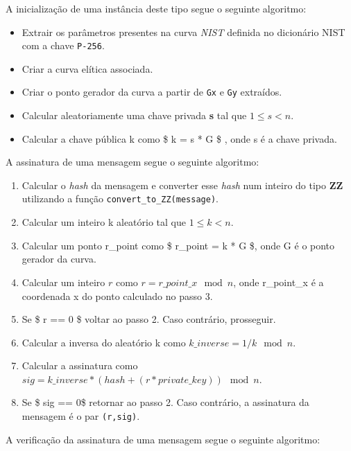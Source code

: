 \documentclass[11pt]{article}
\providecommand{\tightlist}{%
      \setlength{\itemsep}{0pt}\setlength{\parskip}{0pt}}
\begin{document}
A inicialização de uma instância deste tipo segue o seguinte algoritmo:

\begin{itemize}
\tightlist
\item
  Extrair os parâmetros presentes na curva \emph{NIST} definida no
  dicionário NIST com a chave \texttt{P-256}.
\item
  Criar a curva elítica associada.
\item
  Criar o ponto gerador da curva a partir de \texttt{Gx} e \texttt{Gy}
  extraídos.
\item
  Calcular aleatoriamente uma chave privada \textbf{s} tal que $1
  \leqslant s < n$.
  
\item
  Calcular a chave pública k como \$ k = s * G \$ , onde s é a chave
  privada.
\end{itemize}

A assinatura de uma mensagem segue o seguinte algoritmo:

\begin{enumerate}
\def\labelenumi{\arabic{enumi}.}
\tightlist
\item
  Calcular o \emph{hash} da mensagem e converter esse \emph{hash} num
  inteiro do tipo \textbf{ZZ} utilizando a função
  \texttt{convert\_to\_ZZ(message)}.
\item
  Calcular um inteiro k aleatório tal que $1 \leqslant k < n$.
\item
  Calcular um ponto r\_point como \$ r\_point = k * G \$, onde G é o
  ponto gerador da curva.
\item
  Calcular um inteiro $r$ como $r = r\_point\_x \mod n $, onde
  r\_point\_x é a coordenada x do ponto calculado no passo 3.
\item
  Se \$ r == 0 \$ voltar ao passo 2. Caso contrário, prosseguir.
\item
  Calcular a inversa do aleatório k como $ k\_inverse = 1/k \mod n $.
\item
  Calcular a assinatura como $ sig = k\_inverse * (hash + (r *
  private\_key)) \mod n $.
\item
  Se \$ sig == 0\$ retornar ao passo 2. Caso contrário, a assinatura da
  mensagem é o par \texttt{(r,sig)}.
\end{enumerate}

A verificação da assinatura de uma mensagem segue o seguinte algoritmo:
\end{document}
